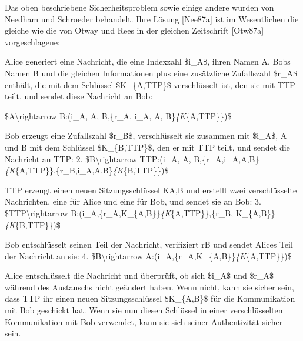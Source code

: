 \documentclass[a4paper]{article}
\begin{document}
\begin{multicols}{3}
      \begin{itemize*}
            \item Das oben beschriebene Sicherheitsproblem sowie einige andere wurden
            von Needham und Schroeder behandelt. Ihre Lösung {[}Nee87a{]} ist im
            Wesentlichen die gleiche wie die von Otway und Rees in der gleichen
            Zeitschrift {[}Otw87a{]} vorgeschlagene:
            \begin{itemize*}
                  \item Alice generiert eine Nachricht, die eine Indexzahl \$i\_A\$, ihren Namen A, Bobs Namen B und die gleichen Informationen plus eine zusätzliche Zufallszahl \$r\_A\$ enthält, die mit dem Schlüssel \$K\_\{A,TTP\}\$ verschlüsselt ist, den sie mit TTP teilt, und sendet diese Nachricht an Bob:
                  \begin{enumerate*} \def\labelenumi{\arabic{enumi}.} \item \$A\textbackslash rightarrow B:(i\_A, A, B,\{r\_A, i\_A, A, B\}\emph{\{K}\{A,TTP\}\})\$ \end{enumerate*}
                  \item Bob erzeugt eine Zufallszahl \$r\_B\$, verschlüsselt sie zusammen mit \$i\_A\$, A und B mit dem Schlüssel \$K\_\{B,TTP\}\$, den er mit TTP teilt, und sendet die Nachricht an TTP: 2. \$B\textbackslash rightarrow TTP:(i\_A, A, B,\{r\_A,i\_A,A,B\}\emph{\{K}\{A,TTP\}\},\{r\_B,i\_A,A,B\}\emph{\{K}\{B,TTP\}\})\$
                  \item TTP erzeugt einen neuen Sitzungsschlüssel KA,B und erstellt zwei verschlüsselte Nachrichten, eine für Alice und eine für Bob, und sendet sie an Bob: 3. \$TTP\textbackslash rightarrow B:(i\_A,\{r\_A,K\_\{A,B\}\}\emph{\{K}\{A,TTP\}\},\{r\_B, K\_\{A,B\}\}\emph{\{K}\{B,TTP\}\})\$
                  \item Bob entschlüsselt seinen Teil der Nachricht, verifiziert rB und sendet Alices Teil der Nachricht an sie: 4. \$B\textbackslash rightarrow A:(i\_A,\{r\_A,K\_\{A,B\}\}\emph{\{K}\{A,TTP\}\})\$
                  \item Alice entschlüsselt die Nachricht und überprüft, ob sich \$i\_A\$ und \$r\_A\$ während des Austauschs nicht geändert haben. Wenn nicht, kann sie sicher sein, dass TTP ihr einen neuen Sitzungsschlüssel \$K\_\{A,B\}\$ für die Kommunikation mit Bob geschickt hat. Wenn sie nun diesen Schlüssel in einer verschlüsselten Kommunikation mit Bob verwendet, kann sie sich seiner Authentizität sicher sein.
            \end{itemize*}

\end{itemize*}
\end{multicols}
\end{document}
